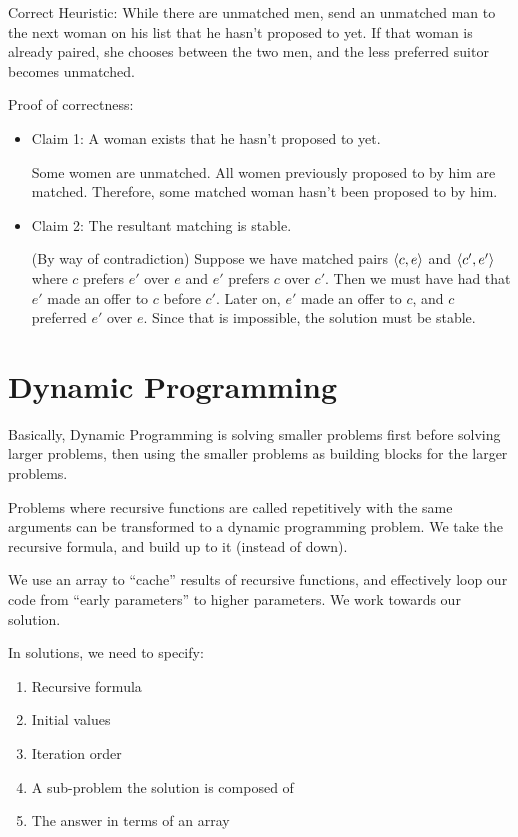         Correct Heuristic: While there are unmatched men, send an unmatched man
        to the next woman on his list that he hasn't proposed to yet. If that
        woman is already paired, she chooses between the two men, and the less
        preferred suitor becomes unmatched.

        Proof of correctness:
        \begin{itemize}
            \item Claim 1: A woman exists that he hasn't proposed to yet.

                Some women are unmatched. All women previously proposed to by
                him are matched. Therefore, some matched woman hasn't been
                proposed to by him.

            \item Claim 2: The resultant matching is stable.

                (By way of contradiction) Suppose we have matched pairs
                $\left \langle c, e \right \rangle $ and $\left \langle c', e' \right \rangle $ where $c$ prefers $e'$ over
                $e$ and $e'$ prefers $c$ over $c'$. Then we must have had that
                $e'$ made an offer to $c$ before $c'$. Later on, $e'$ made an
                offer to $c$, and $c$ preferred $e'$ over $e$. Since that is
                impossible, the solution must be stable.
        \end{itemize}

\chapter{Dynamic Programming}
    Basically, Dynamic Programming is solving smaller problems first before
    solving larger problems, then using the smaller problems as building blocks
    for the larger problems.

    Problems where recursive functions are called repetitively with the same
    arguments can be transformed to a dynamic programming problem. We take the
    recursive formula, and build up to it (instead of down).

    We use an array to ``cache'' results of recursive functions, and effectively
    loop our code from ``early parameters'' to higher parameters. We work
    towards our solution.

    In solutions, we need to specify:
    \begin{enumerate}
        \item Recursive formula
        \item Initial values
        \item Iteration order
        \item A sub-problem the solution is composed of
        \item The answer in terms of an array
    \end{enumerate}

